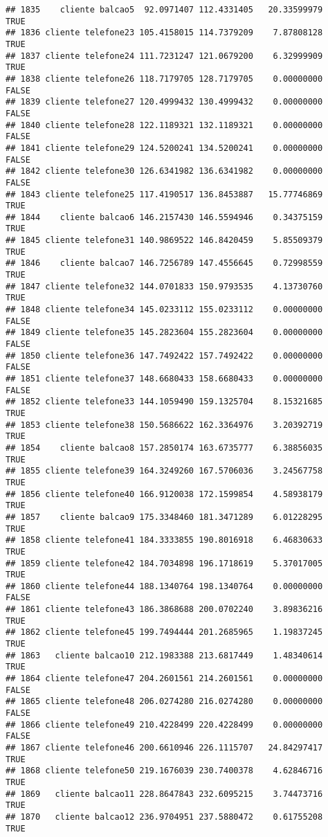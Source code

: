 \documentclass[
]{article}
\begin{document}
\begin{verbatim}
## 1835    cliente balcao5  92.0971407 112.4331405   20.33599979     TRUE
## 1836 cliente telefone23 105.4158015 114.7379209    7.87808128     TRUE
## 1837 cliente telefone24 111.7231247 121.0679200    6.32999909     TRUE
## 1838 cliente telefone26 118.7179705 128.7179705    0.00000000    FALSE
## 1839 cliente telefone27 120.4999432 130.4999432    0.00000000    FALSE
## 1840 cliente telefone28 122.1189321 132.1189321    0.00000000    FALSE
## 1841 cliente telefone29 124.5200241 134.5200241    0.00000000    FALSE
## 1842 cliente telefone30 126.6341982 136.6341982    0.00000000    FALSE
## 1843 cliente telefone25 117.4190517 136.8453887   15.77746869     TRUE
## 1844    cliente balcao6 146.2157430 146.5594946    0.34375159     TRUE
## 1845 cliente telefone31 140.9869522 146.8420459    5.85509379     TRUE
## 1846    cliente balcao7 146.7256789 147.4556645    0.72998559     TRUE
## 1847 cliente telefone32 144.0701833 150.9793535    4.13730760     TRUE
## 1848 cliente telefone34 145.0233112 155.0233112    0.00000000    FALSE
## 1849 cliente telefone35 145.2823604 155.2823604    0.00000000    FALSE
## 1850 cliente telefone36 147.7492422 157.7492422    0.00000000    FALSE
## 1851 cliente telefone37 148.6680433 158.6680433    0.00000000    FALSE
## 1852 cliente telefone33 144.1059490 159.1325704    8.15321685     TRUE
## 1853 cliente telefone38 150.5686622 162.3364976    3.20392719     TRUE
## 1854    cliente balcao8 157.2850174 163.6735777    6.38856035     TRUE
## 1855 cliente telefone39 164.3249260 167.5706036    3.24567758     TRUE
## 1856 cliente telefone40 166.9120038 172.1599854    4.58938179     TRUE
## 1857    cliente balcao9 175.3348460 181.3471289    6.01228295     TRUE
## 1858 cliente telefone41 184.3333855 190.8016918    6.46830633     TRUE
## 1859 cliente telefone42 184.7034898 196.1718619    5.37017005     TRUE
## 1860 cliente telefone44 188.1340764 198.1340764    0.00000000    FALSE
## 1861 cliente telefone43 186.3868688 200.0702240    3.89836216     TRUE
## 1862 cliente telefone45 199.7494444 201.2685965    1.19837245     TRUE
## 1863   cliente balcao10 212.1983388 213.6817449    1.48340614     TRUE
## 1864 cliente telefone47 204.2601561 214.2601561    0.00000000    FALSE
## 1865 cliente telefone48 206.0274280 216.0274280    0.00000000    FALSE
## 1866 cliente telefone49 210.4228499 220.4228499    0.00000000    FALSE
## 1867 cliente telefone46 200.6610946 226.1115707   24.84297417     TRUE
## 1868 cliente telefone50 219.1676039 230.7400378    4.62846716     TRUE
## 1869   cliente balcao11 228.8647843 232.6095215    3.74473716     TRUE
## 1870   cliente balcao12 236.9704951 237.5880472    0.61755208     TRUE

\end{verbatim}
\end{document}
